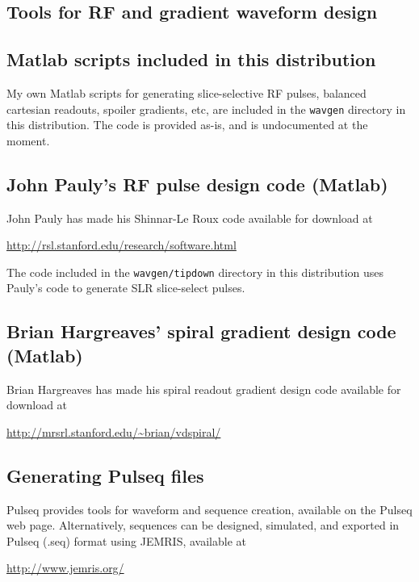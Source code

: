
\begin{appendices}
\chapter{Tools for RF and gradient waveform design}

\section{Matlab scripts included in this distribution}
My own Matlab scripts for generating slice-selective RF pulses, balanced cartesian readouts, spoiler gradients, etc, are included in the \texttt{wavgen} directory in this distribution.
The code is provided as-is, and is undocumented at the moment. 


\section{John Pauly's RF pulse design code (Matlab)}
John Pauly has made his Shinnar-Le Roux code available for download at

\url{http://rsl.stanford.edu/research/software.html}

The code included in the \texttt{wavgen/tipdown} directory in this distribution uses Pauly's code to generate SLR slice-select pulses.


\section{Brian Hargreaves' spiral gradient design code (Matlab)}
Brian Hargreaves has made his spiral readout gradient design code available for download at

\url{http://mrsrl.stanford.edu/~brian/vdspiral/}


\section{Generating Pulseq files}

Pulseq provides tools for waveform and sequence creation, available on the Pulseq web page.
Alternatively, sequences can be designed, simulated, and exported in Pulseq (.seq) format using JEMRIS, available at

\url{http://www.jemris.org/}


\end{appendices}
